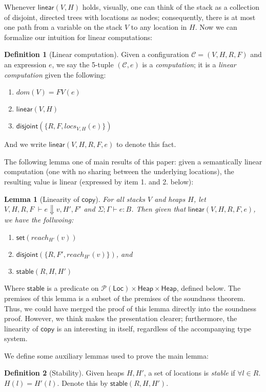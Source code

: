 \documentclass{easychair}
\newcommand{\ms}[1]{\ensuremath{\mathsf{#1}}}
\newcommand{\na}[1]{\mathsf{linear}(#1)}
\newcommand{\stable}[1]{\mathsf{stable}(#1)}
\newcommand{\dist}[1]{\mathsf{disjoint}(#1)}
\newcommand{\wfc}[5]{\mathsf{linear}(#1,#2,#3,#4,#5)}
\newtheorem{lemma}[theorem]{Lemma}
\theoremstyle{definition}
\newtheorem{definition}{Definition}[section]
\begin{document}
Whenever $\na{V,H}$ holds, visually, one can think of the 
stack as a collection of disjoint, directed trees with locations as nodes; 
consequently, there is at 
most one path from a variable on the stack $V$ to any location in $H$. Now we can 
formalize our intuition for linear computations: 

\begin{definition}[Linear computation]
Given a configuration $\mathcal{C} = (V,H,R,F)$ and an expression $e$, 
we say the 5-tuple $(\mathcal{C},e)$ is a \emph{computation}; it is a \emph{linear computation} 
given the following:
\begin{enumerate}
\item $dom(V) = FV(e)$
\item $\na{V,H}$
\item $\dist{\{R,F,locs_{V,H}(e)\}}$
\end{enumerate} 
And we write $\wfc{V}{H}{R}{F}{e}$ to denote this fact.
\end{definition}


The following lemma one of main results of this paper: given a semantically linear computation 
(one with no sharing between the underlying locations), the resulting value is linear 
(expressed by item 1. and 2. below):
\begin{lemma}[Linearity of $\ms{copy}$]\label{itm:na}
For all stacks $V$ and heaps $H$, let  $V,H,R,F \; \vdash e \Downarrow v, H', F'$ 
and $\Sigma; \Gamma \vdash e : B$. Then given that $\wfc{V}{H}{R}{F}{e}$, we have the follwoing: 
\begin{enumerate}
\item $\ms{set}(reach_{H'}(v))$
\item $\dist{\{R,F',reach_{H'}(v)\}}$, and
\item $\stable{R,H,H'}$
\end{enumerate}
\end{lemma}

Where $\ms{stable}$ is a predicate on $\mathcal{P}(\ms{Loc}) \times \ms{Heap} \times \ms{Heap}$, defined
below. The premises of this lemma is a subset of the premises of the soundness theorem. 
Thus, we could have
merged the proof of this lemma directly into the soundness proof. However, we think makes the 
presentation clearer; furthermore, the linearity of $\ms{copy}$ is an interesting in itself, 
regardless of the accompanying type system. 

We define some auxiliary lemmas used to prove the main lemma: 
\begin{definition}[Stability]
Given heaps $H,H'$, a set of locations is \emph{stable} if $\forall l \in R$. $H(l) = H'(l)$. Denote this by
$\stable{R,H,H'}$.
\end{definition}
\end{document}
